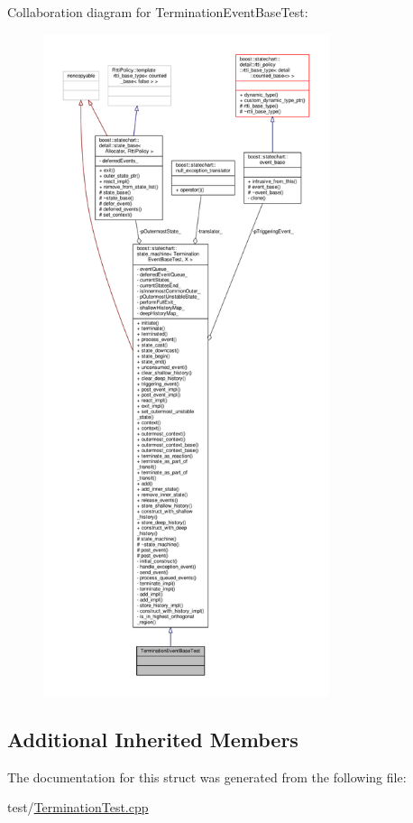 Collaboration diagram for Termination\+Event\+Base\+Test\+:
\nopagebreak
\begin{figure}[H]
\begin{center}
\leavevmode
\includegraphics[height=550pt]{struct_termination_event_base_test__coll__graph}
\end{center}
\end{figure}
\subsection*{Additional Inherited Members}


The documentation for this struct was generated from the following file\+:\begin{DoxyCompactItemize}
\item 
test/\mbox{\hyperlink{_termination_test_8cpp}{Termination\+Test.\+cpp}}\end{DoxyCompactItemize}
